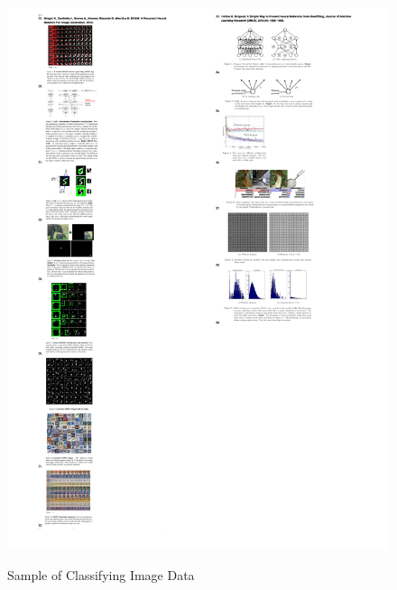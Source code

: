 \documentclass[a4paper,11pt,titlepage]{article}
\begin{document}
		
		\begin{figure}[H]
    			\centering	
		{{\includegraphics[width=16cm]
    				{img/explanation_research_01} 
    			}}%
    			\caption{Sample of Classifying Image Data}%
    		\label{fig:studentprofile}
		\end{figure}
		
\end{document}
